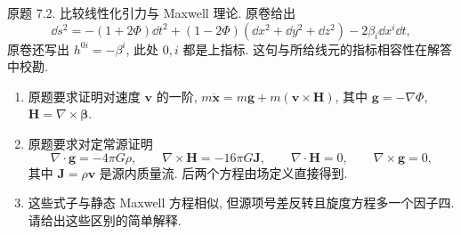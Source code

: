 \begin{exercise}
原题 7.2. 比较线性化引力与 Maxwell 理论. 原卷给出
\[
\dd s^2=-(1+2\Phi)\dd t^2+(1-2\Phi)(\dd x^2+\dd y^2+\dd z^2)
-2\beta_i\dd x^i\dd t,
\]
原卷还写出 $h^{0i}=-\beta^i$, 此处 $0,i$ 都是上指标. 这句与所给线元的指标相容性在解答中校勘.
\begin{enumerate}[label=(\alph*)]
\item 原题要求证明对速度 $\boldsymbol v$ 的一阶, $m\ddot{\boldsymbol x}=m\boldsymbol g+m(\boldsymbol v\times\boldsymbol H)$, 其中 $\boldsymbol g=-\nabla\Phi$, $\boldsymbol H=\nabla\times\boldsymbol\beta$.
\item 原题要求对定常源证明
\[
\nabla\cdot\boldsymbol g=-4\pi G\rho,\qquad
\nabla\times\boldsymbol H=-16\pi G\boldsymbol J,\qquad
\nabla\cdot\boldsymbol H=0,\qquad \nabla\times\boldsymbol g=0,
\]
其中 $\boldsymbol J=\rho\boldsymbol v$ 是源内质量流. 后两个方程由场定义直接得到.
\item 这些式子与静态 Maxwell 方程相似, 但源项号差反转且旋度方程多一个因子四. 请给出这些区别的简单解释.
\end{enumerate}
\end{exercise}
